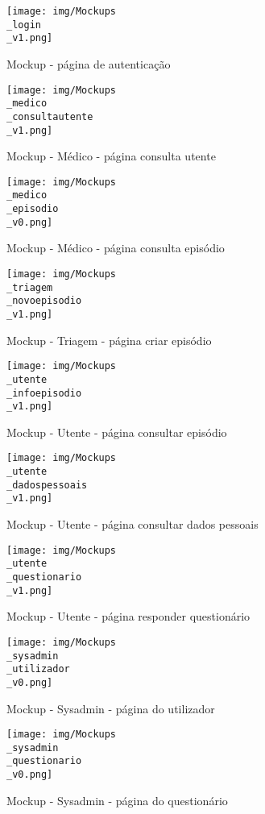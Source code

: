 \begin{figure}[htb]
	\centering
	\texttt{[image: img/Mockups\\\_login\\\_v1.png]}  %
	\caption{Mockup - página de autenticação}
	\label{fig:mckg01}
\end{figure}

\begin{figure}[htb]
	\centering
	\texttt{[image: img/Mockups\\\_medico\\\_consultautente\\\_v1.png]}  %
	\caption{Mockup - Médico - página consulta utente}
	\label{fig:mckm01}
\end{figure}

\begin{figure}[htb]
	\centering
	\texttt{[image: img/Mockups\\\_medico\\\_episodio\\\_v0.png]}  %
	\caption{Mockup - Médico - página consulta episódio}
	\label{fig:mckm02}
\end{figure}

\begin{figure}[htb]
	\centering
	\texttt{[image: img/Mockups\\\_triagem\\\_novoepisodio\\\_v1.png]}  %
	\caption{Mockup - Triagem - página criar episódio}
	\label{fig:mckt01}
\end{figure}

\begin{figure}[htb]
	\centering
	\texttt{[image: img/Mockups\\\_utente\\\_infoepisodio\\\_v1.png]}  %
	\caption{Mockup - Utente - página consultar episódio}
	\label{fig:mcku01}
\end{figure}

\begin{figure}[htb]
	\centering
	\texttt{[image: img/Mockups\\\_utente\\\_dadospessoais\\\_v1.png]}  %
	\caption{Mockup - Utente - página consultar dados pessoais}
	\label{fig:mcku02}
\end{figure}

\begin{figure}[htb]
	\centering
	\texttt{[image: img/Mockups\\\_utente\\\_questionario\\\_v1.png]}  %
	\caption{Mockup - Utente - página responder questionário}
	\label{fig:mcku03}
\end{figure}

\begin{figure}[htb]
	\centering
	\texttt{[image: img/Mockups\\\_sysadmin\\\_utilizador\\\_v0.png]}  %
	\caption{Mockup - Sysadmin - página do utilizador}
	\label{fig:mcks01}
\end{figure}

\begin{figure}[htb]
	\centering
	\texttt{[image: img/Mockups\\\_sysadmin\\\_questionario\\\_v0.png]}  %
	\caption{Mockup - Sysadmin - página do questionário}
	\label{fig:mcks02}
\end{figure}

